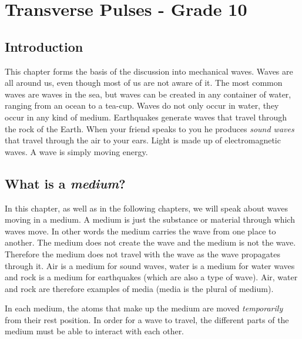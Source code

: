 



\chapter{Transverse Pulses - Grade 10}
\label{p:wsl:tp10}

\section{Introduction}
This chapter forms the basis of the discussion into mechanical waves. Waves are all around us, even though most of us are not aware of it. The most common waves are waves in the sea, but waves can be created in any container of water, ranging from an ocean to a tea-cup. Waves do not only occur in water, they occur in any kind of medium. Earthquakes generate waves that travel through the rock of the Earth. When your friend speaks to you he produces \textit{sound waves} that travel through the air to your ears. Light is made up of electromagnetic waves. A wave is simply moving energy.

\section{What is a \textit{medium}?}

In this chapter, as well as in the following chapters, we will speak about waves moving in a medium. A medium is just the substance or material through which waves move. In other words the medium carries the wave from one place to another. The medium does not create the wave and the medium is not the wave. Therefore the medium does not travel with the wave as the wave propagates through it. Air is a medium for sound waves, water is a medium for water waves and rock is a medium for earthquakes (which are also a type of wave). Air, water and rock are therefore examples of media (media is the plural of medium).


In each medium, the atoms that make up the medium are moved \textit{temporarily} from their rest position. In order for a wave to travel, the different parts of the medium must be able to interact with each other.

